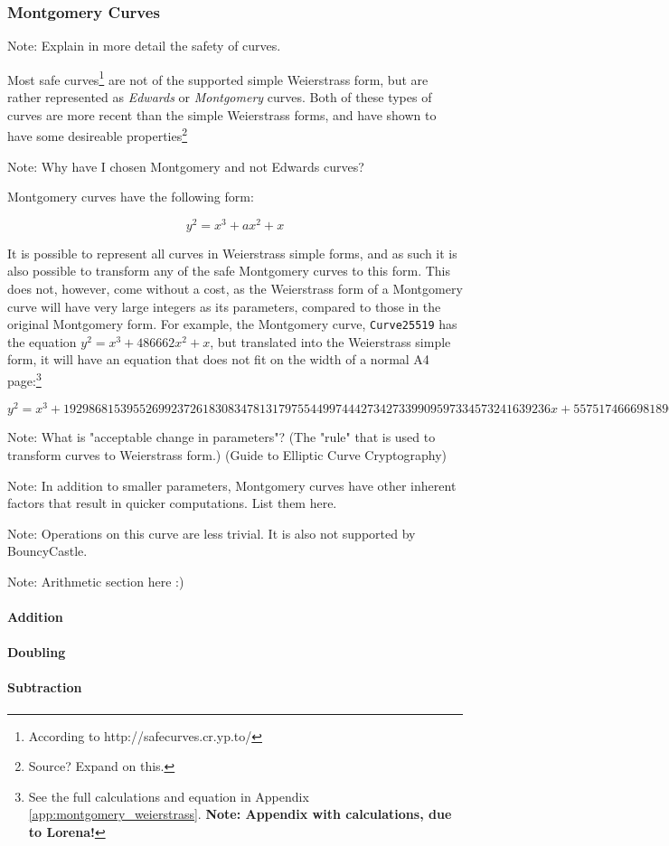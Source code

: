 \subsubsection{Montgomery Curves}

Note: Explain in more detail the safety of curves.

Most safe curves\footnote{According to http://safecurves.cr.yp.to/} are not of the supported simple
Weierstrass form, but are rather represented as \emph{Edwards} or \emph{Montgomery} curves. Both of
these types of curves are more recent than the simple Weierstrass forms, and have shown to have some
desireable properties\footnote{Source? Expand on this.}

Note: Why have I chosen Montgomery and not Edwards curves?

Montgomery curves have the following form:

\begin{equation}
	y^2 = x^3 + ax^2 + x
\end{equation}

It is possible to represent all curves in Weierstrass simple forms, and as such it is also possible to
transform any of the safe Montgomery curves to this form.\cite{safecurves}
This does not, however, come without a cost, as the Weierstrass form of a Montgomery curve will have
very large integers as its parameters, compared to those in the original Montgomery form. For example,
the Montgomery curve, \verb|Curve25519| has the equation \(y^2 = x^3+486662x^2+x\), but
translated into the Weierstrass simple form, it will have an equation that does not fit on the width of
a normal A4 page:\footnote{See the full calculations and equation in Appendix \ref{app:montgomery_weierstrass}.
{\bf Note: Appendix with calculations, due to Lorena!}}

\begin{equation}
	y^2 =
	x^3 +
	19298681539552699237261830834781317975544997444273427339909597334573241639236x +
	55751746669818908907645289078257140818241103727901012315294400837956729358436
\end{equation}

Note: What is "acceptable change in parameters"? (The "rule" that is used to transform curves to Weierstrass form.) (Guide to Elliptic Curve Cryptography)

Note: In addition to smaller parameters, Montgomery curves have other inherent factors that result in quicker
computations. List them here.

Note: Operations on this curve are less trivial. It is also not supported by BouncyCastle.

Note: Arithmetic section here :)

\paragraph{Addition}

\paragraph{Doubling}

\paragraph{Subtraction}